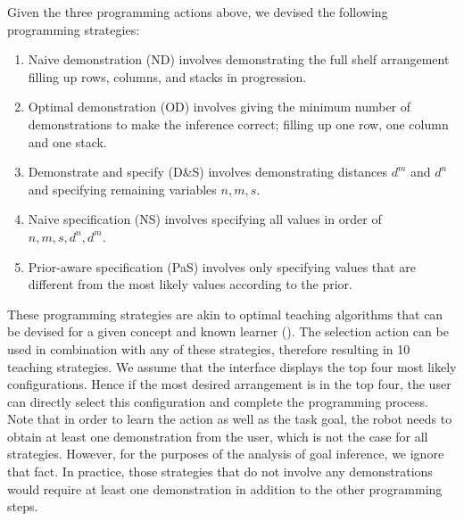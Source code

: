 Given the three programming actions above, we devised the following programming strategies:
\begin{enumerate}
	\item Naive demonstration (ND) involves demonstrating the full shelf arrangement filling up rows, columns, and stacks in progression.
	\item Optimal demonstration (OD) involves giving the minimum number of demonstrations to make the inference correct; \ie filling up one row, one column and one stack.
	\item Demonstrate and specify (D\&S) involves demonstrating distances $d^m$ and $d^n$ and specifying remaining variables $n,m,s$.
	\item Naive specification (NS) involves specifying all values in order of $n, m, s, d^n, d^m$.
	\item Prior-aware specification (PaS) involves only specifying values that are different from the most likely values according to the prior.
\end{enumerate}

These programming strategies are akin to optimal teaching algorithms that can be devised for a given concept and known learner (\cite{cakmak2012aaai,khan2011humans}).
The selection action can be used in combination with any of these strategies, therefore resulting in 10 teaching strategies.
We assume that the interface displays the top four most likely configurations.
Hence if the most desired arrangement is in the top four, the user can directly select this configuration and complete the programming process.
Note that in order to learn the action as well as the task goal, the robot needs to obtain at least one demonstration from the user, which is not the case for all strategies.
However, for the purposes of the analysis of goal inference, we ignore that fact.
In practice, those strategies that do not involve any demonstrations would require at least one demonstration in addition to the other programming steps.



